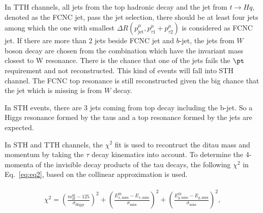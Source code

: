In TTH channels, all jets from the top hadronic decay and the jet from $t\to Hq$, denoted as the FCNC jet, pass the jet selection, there should be at least four jets among which the one with smallest $\Delta R(p^{\mu}_{\text{jet}},p^{\mu}_{\tau1}+p^{\mu}_{\tau2})$ is considered as FCNC jet. If there are more than 2 jets beside FCNC jet and $b$-jet, the jets from $W$ boson decay are chosen from the combination which have the invariant mass closest to W resonance. There is the chance that one of the jets fails the $\pt$ requirement and not reconstructed. This kind of events will fall into STH channel. The FCNC top resonance is still reconstructed given the big chance that the jet which is missing is from $W$ decay.

In STH events, there are 3 jets coming from top decay including the b-jet. So a Higgs resonance formed by the taus and a top resonance formed by the jets are expected.

In STH and TTH channels, the $\chi^2$ fit
is used to recontruct the ditau mass and momentum by taking the $\tau$ decay kinematics into account. To determine the 4-momenta of the invisible decay products of the tau decays, the following $\chi^2$ in Eq.~\ref{eq:eq2}, based on the collinear approximation is used.

\begin{eqnarray}
\begin{array}{ll}
\chi^2 = 
\left( \frac{m_{H}^{\text{fit}} - 125}{\sigma_{\text{Higgs}}} \right)^2 + \left( \frac{E_{x,\text{miss}}^{\text{fit}} - E_{x,\text{miss}}}{\sigma_{\text{miss}}} \right)^2 + \left( \frac{E_{y,\text{miss}}^{\text{fit}} - E_{y,\text{miss}}}{\sigma_{\text{miss}}} \right)^2 ,
\end{array}
\label{eq:eq2}
\end{eqnarray}

